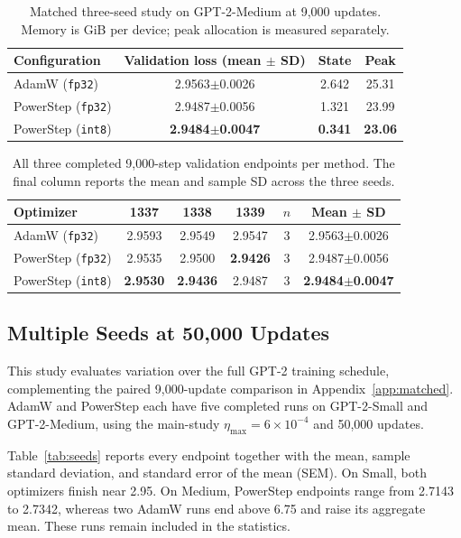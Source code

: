 \documentclass{article}
\begin{document}
\begin{table}[!htb]
\centering\small

\begin{tabular}{lccc}\toprule
Configuration & Validation loss (mean $\pm$ SD) & State & Peak \\\midrule
AdamW (\texttt{fp32}) & 2.9563$\pm$0.0026 & 2.642 & 25.31\\
PowerStep (\texttt{fp32}) & 2.9487$\pm$0.0056 & 1.321 & 23.99\\
PowerStep (\texttt{int8}) & \textbf{2.9484$\pm$0.0047} & \textbf{0.341} & \textbf{23.06}\\\bottomrule
\end{tabular}
\caption{Matched three-seed study on GPT-2-Medium at 9,000 updates. Memory is GiB per device; peak allocation is measured separately.}
\label{tab:matched-main}
\end{table}

\begin{table}[ht]
\centering\small

\begin{tabular}{lccccc}\toprule
Optimizer & 1337 & 1338 & 1339 & $n$ & Mean $\pm$ SD\\\midrule
AdamW (\texttt{fp32}) & 2.9593 & 2.9549 & 2.9547 & 3 & 2.9563$\pm$0.0026 \\
PowerStep (\texttt{fp32}) & 2.9535 & 2.9500 & \textbf{2.9426}  & 3 & 2.9487$\pm$0.0056 \\
PowerStep (\texttt{int8}) & \textbf{2.9530}  & \textbf{2.9436}  & 2.9487 & 3 & \textbf{2.9484$\pm$0.0047}  \\
\bottomrule\end{tabular}
\caption{All three completed 9,000-step validation endpoints per method. The final column reports the mean and sample SD across the three seeds.}
\label{tab:all-seeds}
\end{table}

\FloatBarrier
\subsection{Multiple Seeds at 50,000 Updates}\label{sec:long-seeds}
This study evaluates variation over the full GPT-2 training schedule, complementing the paired 9,000-update comparison in Appendix~\ref{app:matched}. AdamW and PowerStep each have five completed runs on GPT-2-Small and GPT-2-Medium, using the main-study $\eta_{\max}=6\times10^{-4}$ and 50,000 updates.

Table~\ref{tab:seeds} reports every endpoint together with the mean, sample standard deviation, and standard error of the mean (SEM). On Small, both optimizers finish near 2.95. On Medium, PowerStep endpoints range from 2.7143 to 2.7342, whereas two AdamW runs end above 6.75 and raise its aggregate mean. These runs remain included in the statistics.
\end{document}
